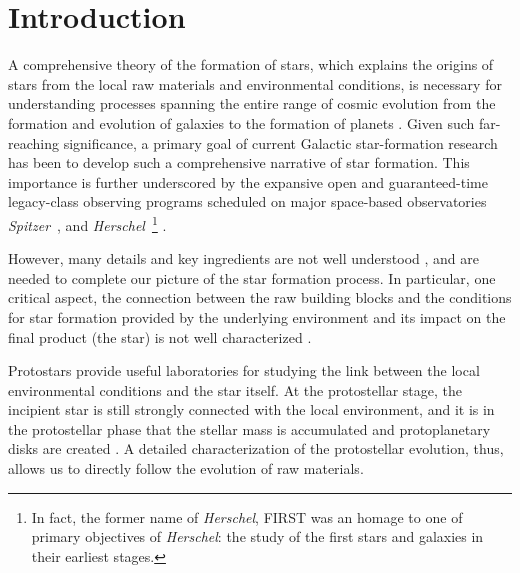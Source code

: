 \documentclass[manuscript]{aastex61}
\newcommand{\herschel}{{\em Herschel}}
\newcommand{\spitzer}{{\em Spitzer}}
\begin{document}

\section{Introduction}
\par
A comprehensive theory of the formation of stars, which explains the origins of stars from the local raw materials and environmental conditions, is necessary for understanding processes spanning the entire range of cosmic evolution from the formation and evolution of galaxies to the formation of planets \citep{ke2012}.  Given such far-reaching significance, a primary goal of current Galactic star-formation research has been to develop such a comprehensive narrative of star formation.  This importance is further underscored by the expansive open and guaranteed-time legacy-class observing programs scheduled on major space-based observatories \spitzer\ \citep{spitzer}, and \herschel\ \footnote{In fact, the former name of \herschel, FIRST was an homage to one of primary objectives of \herschel: the study of the first stars and galaxies in their earliest stages.} \citep{herschel}.
\par
However, many details and key ingredients  are not well understood \citep{mo07}, and are needed to complete our picture of the star formation process.  In particular, one critical aspect, the connection between the raw building blocks and the conditions for star formation provided by the underlying environment and its impact on the final product (the star) is not well characterized \citep{dunham}.
\par
Protostars provide useful laboratories for studying the link between the local environmental conditions and the star itself.  At the protostellar stage, the incipient star is still strongly connected with the local environment, and it is in the protostellar phase that the stellar mass is accumulated and protoplanetary disks are created \citep{c2d09}.  A detailed characterization of the protostellar evolution, thus, allows us to directly follow the evolution of raw materials.
\par
\end{document}
